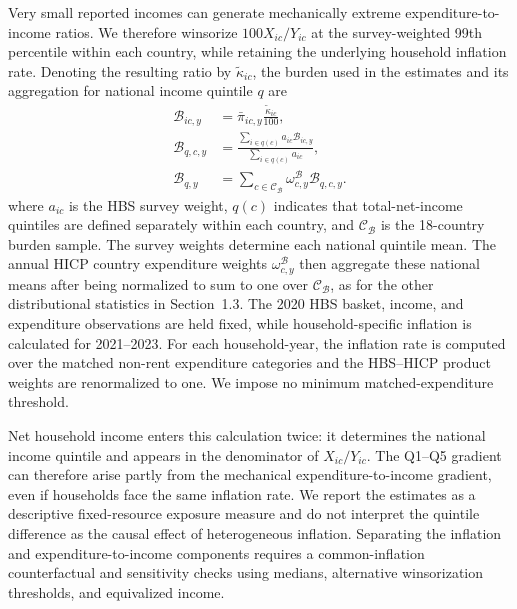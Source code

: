 \documentclass[11pt]{article}
\begin{document}
Very small reported incomes can generate mechanically extreme expenditure-to-income ratios. We
therefore winsorize $100X_{ic}/Y_{ic}$ at the survey-weighted 99th percentile within each country,
while retaining the underlying household inflation rate. Denoting the resulting ratio by
$\widetilde{\kappa}_{ic}$, the burden used in the estimates and its aggregation for national income
quintile $q$ are
\begin{equation}
\begin{aligned}
\mathcal{B}_{ic,y}
&=\bar{\pi}_{ic,y}\frac{\widetilde{\kappa}_{ic}}{100},\\
\mathcal{B}_{q,c,y}
&=\frac{\sum_{i\in q(c)}a_{ic}\mathcal{B}_{ic,y}}
{\sum_{i\in q(c)}a_{ic}},\\
\mathcal{B}_{q,y}
&=\sum_{c\in\mathcal C_{\mathcal B}}
\omega^{\mathcal B}_{c,y}\mathcal{B}_{q,c,y}.
\end{aligned}
\label{eq:aggregate-micro-inflation-burden}
\end{equation}
where $a_{ic}$ is the HBS survey weight, $q(c)$ indicates that total-net-income quintiles are
defined separately within each country, and $\mathcal C_{\mathcal B}$ is the 18-country burden
sample. The survey weights determine each national quintile mean. The annual HICP country
expenditure weights $\omega^{\mathcal B}_{c,y}$ then aggregate these national means after being
normalized to sum to one over $\mathcal C_{\mathcal B}$, as for the other distributional statistics
in Section~1.3.
The 2020 HBS basket, income, and expenditure observations are held fixed, while household-specific
inflation is calculated for 2021--2023. For each household-year, the inflation rate is computed over
the matched non-rent expenditure categories and the HBS--HICP product weights are renormalized to
one. We impose no minimum matched-expenditure threshold.

Net household income enters this calculation twice: it determines the national income quintile and
appears in the denominator of $X_{ic}/Y_{ic}$. The Q1--Q5 gradient can therefore arise partly from
the mechanical expenditure-to-income gradient, even if households face the same inflation rate.
We report the estimates as a descriptive fixed-resource exposure measure and do not interpret the
quintile difference as the causal effect of heterogeneous inflation. Separating the inflation and
expenditure-to-income components requires a common-inflation counterfactual and sensitivity checks
using medians, alternative winsorization thresholds, and equivalized income.
\end{document}

